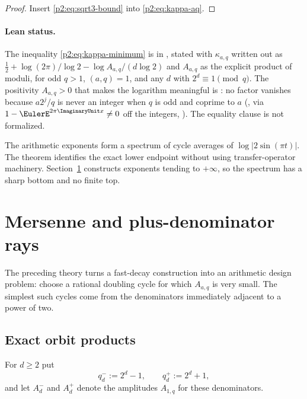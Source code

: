 \documentclass[11pt,oneside]{article}
\theoremstyle{definition}
\theoremstyle{remark}
\begin{document}
\begin{proof}
Insert \eqref{p2:eq:sqrt3-bound} into \eqref{p2:eq:kappa-aq}.
\end{proof}

\paragraph{Lean status.}
The inequality \eqref{p2:eq:kappa-minimum} is 
in , stated with $\kappa_{a,q}$ written out as
$\tfrac12+\log(2\pi)/\log2-\log A_{a,q}/(d\log2)$ and $A_{a,q}$ as the explicit product
of moduli, for odd $q>1$, $(a,q)=1$, and any $d$ with $2^{d}\equiv1\pmod q$.  The
positivity $A_{a,q}>0$ that makes the logarithm meaningful is
: no factor vanishes because $a2^{j}/q$ is
never an integer when $q$ is odd and coprime to $a$
(, via $1-\EulerE^{2\pi\ImaginaryUnit x}\ne0$ off the
integers, ).  The equality clause is not
formalized.

\begin{remark}
The arithmetic exponents form a spectrum of cycle averages of
$\log|2\sin(\pi t)|$. The theorem identifies the exact lower endpoint without
using transfer-operator machinery. Section~\ref{p2:sec:mersenne} constructs exponents
tending to $+\infty$, so the spectrum has a sharp bottom and no finite top.
\end{remark}

\section{Mersenne and plus-denominator rays}\label{p2:sec:mersenne}

The preceding theory turns a fast-decay construction into an arithmetic design
problem: choose a rational doubling cycle for which $A_{a,q}$ is very small. The
simplest such cycles come from the denominators immediately adjacent to a power of
two.

\subsection{Exact orbit products}

For $d\ge2$ put
\begin{equation}
 q_d^-:=2^d-1,
 \qquad q_d^+:=2^d+1,
 \label{p2:eq:qpm}
\end{equation}
and let $A_d^-$ and $A_d^+$ denote the amplitudes $A_{1,q}$ for these denominators.
\end{document}
